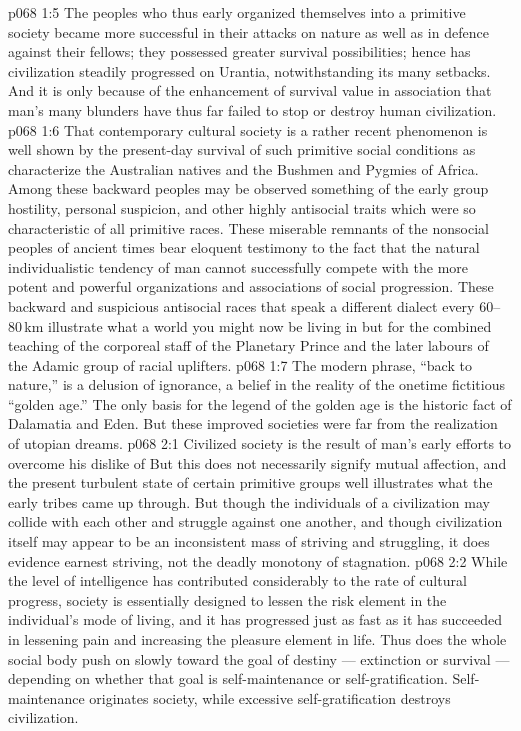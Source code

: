 \vs p068 1:5 The peoples who thus early organized themselves into a primitive society became more successful in their attacks on nature as well as in defence against their fellows; they possessed greater survival possibilities; hence has civilization steadily progressed on Urantia, notwithstanding its many setbacks. And it is only because of the enhancement of survival value in association that man’s many blunders have thus far failed to stop or destroy human civilization.
\vs p068 1:6 \pc That contemporary cultural society is a rather recent phenomenon is well shown by the present\hyp{}day survival of such primitive social conditions as characterize the Australian natives and the Bushmen and Pygmies of Africa. Among these backward peoples may be observed something of the early group hostility, personal suspicion, and other highly antisocial traits which were so characteristic of all primitive races. These miserable remnants of the nonsocial peoples of ancient times bear eloquent testimony to the fact that the natural individualistic tendency of man cannot successfully compete with the more potent and powerful organizations and associations of social progression. These backward and suspicious antisocial races that speak a different dialect every 60--80\,km illustrate what a world you might now be living in but for the combined teaching of the corporeal staff of the Planetary Prince and the later labours of the Adamic group of racial uplifters.
\vs p068 1:7 The modern phrase, “back to nature,” is a delusion of ignorance, a belief in the reality of the onetime fictitious “golden age.” The only basis for the legend of the golden age is the historic fact of Dalamatia and Eden. But these improved societies were far from the realization of utopian dreams.
\vs p068 2:1 Civilized society is the result of man’s early efforts to overcome his dislike of  But this does not necessarily signify mutual affection, and the present turbulent state of certain primitive groups well illustrates what the early tribes came up through. But though the individuals of a civilization may collide with each other and struggle against one another, and though civilization itself may appear to be an inconsistent mass of striving and struggling, it does evidence earnest striving, not the deadly monotony of stagnation.
\vs p068 2:2 While the level of intelligence has contributed considerably to the rate of cultural progress, society is essentially designed to lessen the risk element in the individual’s mode of living, and it has progressed just as fast as it has succeeded in lessening pain and increasing the pleasure element in life. Thus does the whole social body push on slowly toward the goal of destiny --- extinction or survival --- depending on whether that goal is self\hyp{}maintenance or self\hyp{}gratification. Self\hyp{}maintenance originates society, while excessive self\hyp{}gratification destroys civilization.
